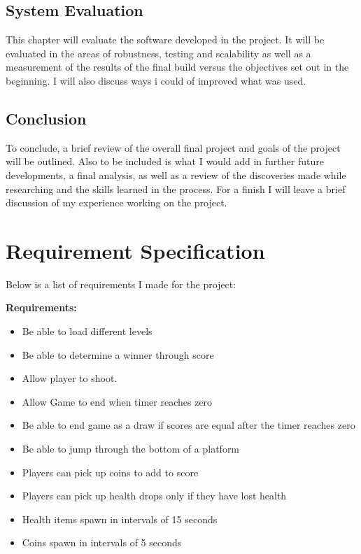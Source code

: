 \subsection{System Evaluation}
This chapter will evaluate the software developed in the project. It will be evaluated in the areas of robustness, testing and scalability as well as a measurement of the results of the final build versus the objectives set out in the beginning. I will also discuss ways i could of improved what was used.

\subsection{Conclusion}
To conclude, a brief review of the overall final project and goals of the project will be outlined. Also to be included is what I would add in further future developments, a final analysis, as well as a review of the discoveries made while researching and the skills learned in the process. For a finish I will leave a brief discussion of my experience working on the project.\cite{}

\section{Requirement Specification}

Below is a list of requirements I made for the project: \par \bigskip
\textbf {Requirements:}

\begin{itemize}
  \item  Be able to load different levels \par
  \item  Be able to determine a winner through score \par
  \item  Allow player to shoot. \par
  \item  Allow Game to end when timer reaches zero \par
  \item  Be able to end game as a draw if scores are equal after the timer reaches zero \par
  \item  Be able to jump through the bottom of a platform \par
  \item  Players can pick up coins to add to score \par
  \item  Players can pick up health drops only if they have lost health \par
  \item  Health items spawn in intervals of 15 seconds  \par
  \item  Coins spawn in intervals of 5 seconds \par
\end{itemize}





